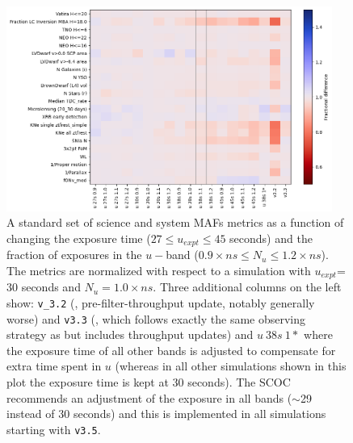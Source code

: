 \begin{figure}
\centering
   \includegraphics[width=0.95\textwidth]{figures/u_band_scoc_heatmap.png}
\caption{ A standard set of science and system MAFs metrics as a function of changing the exposure time ($27\leq u_{expt}\leq 45$ seconds) and the fraction of exposures in the $u-$band ($0.9\times ns\leq N_u \leq1.2\times ns$). The metrics are normalized with respect to a simulation with $u_{expt}$= 30 seconds and $N_u = 1.0\times ns$. Three additional columns on the left show: \texttt{v\_3.2} (, pre-filter-throughput update, notably generally worse) and \texttt{v3.3} (, which follows exactly the same observing strategy as  but includes throughput updates) and $u~38s~1*$ where the exposure time of all other bands is adjusted to compensate for extra time spent in $u$ (whereas in all other simulations shown in this plot the exposure time is kept at 30 seconds). The SCOC recommends an adjustment of the exposure in all bands ($\sim$29 instead of 30 seconds) and this is implemented in all simulations starting with \texttt{v3.5}.}
\label{fig:uband}
\end{figure}
\FloatBarrier

